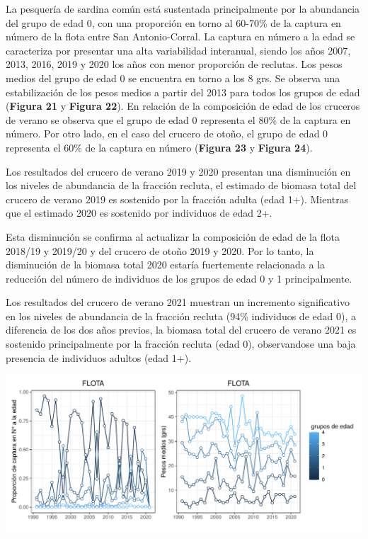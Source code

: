 \documentclass[
  spanish,
]{article}
\begin{document}
\quad

La pesquería de sardina común está sustentada principalmente por la
abundancia del grupo de edad 0, con una proporción en torno al 60-70\%
de la captura en número de la flota entre San Antonio-Corral. La captura
en número a la edad se caracteriza por presentar una alta variabilidad
interanual, siendo los años 2007, 2013, 2016, 2019 y 2020 los años con
menor proporción de reclutas. Los pesos medios del grupo de edad 0 se
encuentra en torno a los 8 grs. Se observa una estabilización de los
pesos medios a partir del 2013 para todos los grupos de edad
(\textbf{Figura 21} y \textbf{Figura 22}). En relación de la composición
de edad de los cruceros de verano se observa que el grupo de edad 0
representa el 80\% de la captura en número. Por otro lado, en el caso
del crucero de otoño, el grupo de edad 0 representa el 60\% de la
captura en número (\textbf{Figura 23} y \textbf{Figura 24}).

Los resultados del crucero de verano 2019 y 2020 presentan una
disminución en los niveles de abundancia de la fracción recluta, el
estimado de biomasa total del crucero de verano 2019 es sostenido por la
fracción adulta (edad 1+). Mientras que el estimado 2020 es sostenido
por individuos de edad 2+.

Esta disminución se confirma al actualizar la composición de edad de la
flota 2018/19 y 2019/20 y del crucero de otoño 2019 y 2020. Por lo
tanto, la disminución de la biomasa total 2020 estaría fuertemente
relacionada a la reducción del número de individuos de los grupos de
edad 0 y 1 principalmente.

Los resultados del crucero de verano 2021 muestran un incremento
significativo en los niveles de abundancia de la fracción recluta (94\%
individuos de edad 0), a diferencia de los dos años previos, la biomasa
total del crucero de verano 2021 es sostenido principalmente por la
fracción recluta (edad 0), observandose una baja presencia de individuos
adultos (edad 1+).

\begin{center}\includegraphics{FigurasInforme_Marzo/F21_datComp-1} \end{center}
\end{document}

